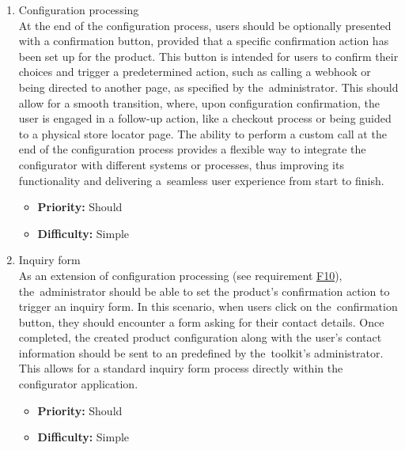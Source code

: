 \begin{enumerate}[label=\textbf{F\arabic*:}, leftmargin=30pt]
\item \label{itm:F10} Configuration processing
\vspace{2pt}
\\At the end of the configuration process, users should be optionally presented with a confirmation button, provided that a specific confirmation action has been set up for the product. This button is intended for users to confirm their choices and trigger a predetermined action, such as calling a webhook or being directed to another page, as specified by the~administrator. This should allow for a smooth transition, where, upon configuration confirmation, the user is engaged in a follow-up action, like a checkout process or being guided to a physical store locator page. The ability to perform a custom  call at the end of the configuration process provides a flexible way to integrate the configurator with different systems or processes, thus improving its functionality and delivering a~seamless user experience from start to finish.
\begin{itemize}[noitemsep, label=\trianglebullet]
    \item \textbf{Priority:} Should
    \item \textbf{Difficulty:} Simple
\end{itemize}
\vspace{4pt}

\item \label{itm:F11} Inquiry form
\vspace{2pt}
\\As an extension of configuration processing (see requirement \hyperref[itm:F10]{F10}), the~administrator should be able to set the product's confirmation action to trigger an inquiry form. In this scenario, when users click on the~confirmation button, they should encounter a form asking for their contact details. Once completed, the created product configuration along with the user's contact information should be sent to an  predefined by the~toolkit's administrator. This allows for a standard inquiry form process directly within the configurator application.
\begin{itemize}[noitemsep, label=\trianglebullet]
    \item \textbf{Priority:} Should
    \item \textbf{Difficulty:} Simple
\end{itemize}
\vspace{4pt}


\end{enumerate}
